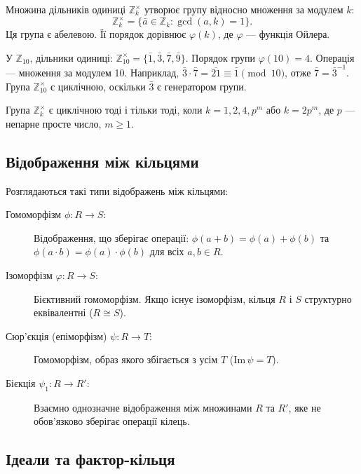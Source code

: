 Множина дільників одиниці \(\mathbb{Z}_k^\times\) утворює групу відносно множення за модулем \(k\):
\[
    \mathbb{Z}_k^\times = \{\bar{a}\in\mathbb{Z}_k : \gcd(a,k)=1\}.
\]
Ця група є абелевою.
Її порядок дорівнює \(\varphi(k)\), де \(\varphi\) — функція Ойлера.

\begin{example}
    \label{ex:z10_units}
    У \(\mathbb{Z}_{10}\), дільники одиниці: \(\mathbb{Z}_{10}^\times = \{\bar{1},\bar{3},\bar{7},\bar{9}\}\).
    Порядок групи \(\varphi(10) = 4\).
    Операція — множення за модулем 10.
    Наприклад, \(\bar{3}\cdot\bar{7} = \overline{21} \equiv \bar{1} \pmod{10}\), отже \(\bar{7} = \bar{3}^{-1}\).
    Група \(\mathbb{Z}_{10}^\times\) є циклічною, оскільки \(\bar{3}\) є генератором групи.
\end{example}

\begin{theorem}
    \label{thm:cyclic_units}
    Група \(\mathbb{Z}_k^\times\) є циклічною тоді і тільки тоді, коли \(k=1,2,4,p^m\) або \(k=2p^m\), де \(p\) — непарне просте число, \(m\geq1\).
\end{theorem}

\subsection{Відображення між кільцями}
\label{subsec:ring_mappings}

Розглядаються такі типи відображень між кільцями:

\begin{description}
    \item[Гомоморфізм \(\phi: R\to S\):] Відображення, що зберігає операції: \(\phi(a+b)=\phi(a)+\phi(b)\) та \(\phi(a\cdot b)=\phi(a)\cdot\phi(b)\) для всіх \(a,b\in R\).
    \item[Ізоморфізм \(\varphi: R\to S\):] Бієктивний гомоморфізм.
    Якщо існує ізоморфізм, кільця \(R\) і \(S\) структурно еквівалентні (\(R\cong S\)).
    \item[Сюр'єкція (епіморфізм) \(\psi: R\to T\):] Гомоморфізм, образ якого збігається з усім \(T\) (\(\mathrm{Im}\,\psi = T\)).
    \item[Бієкція \(\psi_1: R\to R'\):] Взаємно однозначне відображення між множинами \(R\) та \(R'\), яке не обов'язково зберігає операції кілець.
\end{description}

\subsection{Ідеали та фактор-кільця}
\label{subsec:factor_rings}

